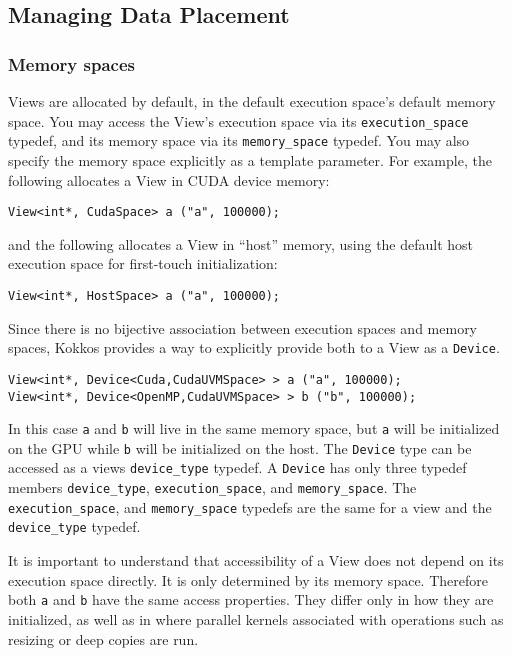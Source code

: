 \subsection{Managing Data Placement}\label{S:View:Placement}

\subsubsection{Memory spaces}

Views are allocated by default, in the default execution space's
default memory space.  You may access the View's execution space via
its \lstinline!execution_space! typedef, and its memory space via its
\lstinline!memory_space! typedef.  You may also specify the memory space
explicitly as a template parameter.  For example, the following
allocates a View in CUDA device memory:
\begin{lstlisting}
View<int*, CudaSpace> a ("a", 100000);
\end{lstlisting}
and the following allocates a View in ``host'' memory, using the default 
host execution space for first-touch initialization:
\begin{lstlisting}
View<int*, HostSpace> a ("a", 100000);
\end{lstlisting}

Since there is no bijective association between execution spaces and memory 
spaces, Kokkos provides a way to explicitly provide both to a View as a 
\lstinline|Device|. 
\begin{lstlisting}
View<int*, Device<Cuda,CudaUVMSpace> > a ("a", 100000);
View<int*, Device<OpenMP,CudaUVMSpace> > b ("b", 100000);
\end{lstlisting}
In this case \lstinline|a| and \lstinline|b| will live in the same memory space,
but \lstinline|a| will be initialized on the GPU while \lstinline|b| will be 
initialized on the host. 
The \lstinline|Device| type can be accessed as a views \lstinline|device_type|
typedef. A \lstinline|Device| has only three typedef members 
\lstinline|device_type|, \lstinline|execution_space|, and \lstinline|memory_space|.
The \lstinline|execution_space|, and \lstinline|memory_space| typedefs are
the same for a view and the \lstinline|device_type| typedef.

It is important to understand that accessibility of a View does not 
depend on its execution space directly. It is only determined by its
memory space. Therefore both \lstinline|a| and \lstinline|b| have the 
same access properties. They differ only in how they are initialized, 
as well as in where parallel kernels associated with operations such 
as resizing or deep copies are run. 


